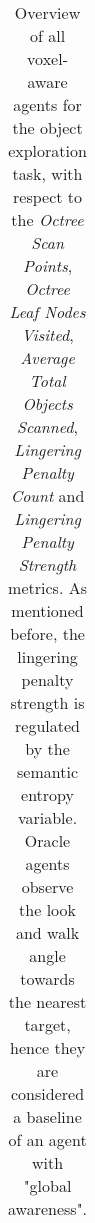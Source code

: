 \begin{sidewaystable}
\begin{longtable}{|l|c|c|c|c|c|c|}
            \caption{
                Overview of all voxel-aware agents for the object exploration task, with respect to the \textit{Octree Scan Points}, \textit{Octree Leaf Nodes Visited}, \textit{Average Total Objects Scanned}, 
                \textit{Lingering Penalty Count} and \textit{Lingering Penalty Strength} metrics. As mentioned before, the lingering penalty strength is regulated by the semantic entropy variable. Oracle agents observe the look and walk angle towards the nearest target, hence they are considered a baseline of an agent with "global awareness".
            }
            \label{tab:results-RQ1-explorative-performance}
        \end{longtable}

\end{sidewaystable}


